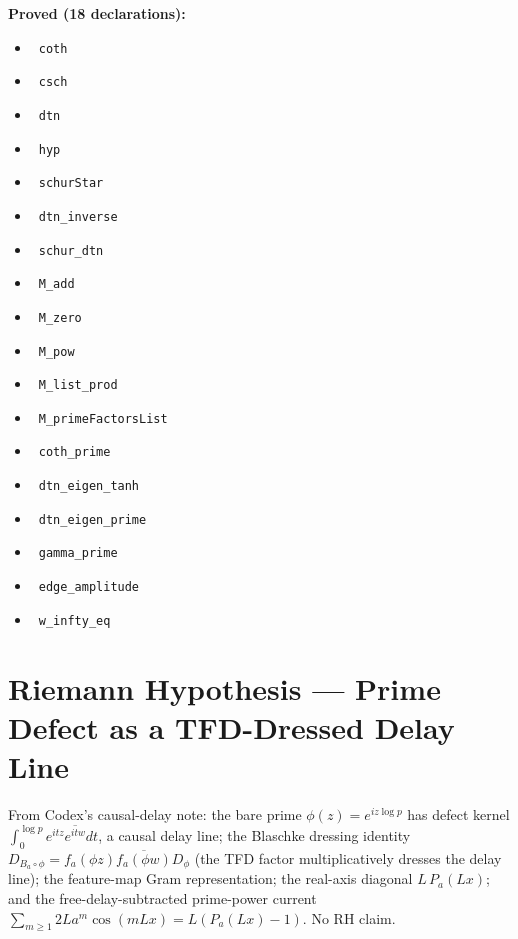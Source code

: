 \documentclass{report}
\theoremstyle{definition}
\begin{document}
\noindent\textbf{Proved (18 declarations):}
\begin{itemize}
  \item {}\leanok\ \texttt{coth}
  \item {}\leanok\ \texttt{csch}
  \item {}\leanok\ \texttt{dtn}
  \item {}\leanok\ \texttt{hyp}
  \item {}\leanok\ \texttt{schurStar}
  \item {}\leanok\ \texttt{dtn\_inverse}
  \item {}\leanok\ \texttt{schur\_dtn}
  \item {}\leanok\ \texttt{M\_add}
  \item {}\leanok\ \texttt{M\_zero}
  \item {}\leanok\ \texttt{M\_pow}
  \item {}\leanok\ \texttt{M\_list\_prod}
  \item {}\leanok\ \texttt{M\_primeFactorsList}
  \item {}\leanok\ \texttt{coth\_prime}
  \item {}\leanok\ \texttt{dtn\_eigen\_tanh}
  \item {}\leanok\ \texttt{dtn\_eigen\_prime}
  \item {}\leanok\ \texttt{gamma\_prime}
  \item {}\leanok\ \texttt{edge\_amplitude}
  \item {}\leanok\ \texttt{w\_infty\_eq}
\end{itemize}

\section{Riemann Hypothesis --- Prime Defect as a TFD-Dressed Delay Line}
From Codex's causal-delay note: the bare prime $\phi(z)=e^{iz\log p}$ has defect kernel $\int_0^{\log p}e^{itz}\overline{e^{itw}}dt$, a causal delay line; the Blaschke dressing identity $D_{B_a\circ\phi}=f_a(\phi z)\overline{f_a(\phi w)}D_\phi$ (the TFD factor multiplicatively dresses the delay line); the feature-map Gram representation; the real-axis diagonal $L\,P_a(Lx)$; and the free-delay-subtracted prime-power current $\sum_{m\ge1}2La^m\cos(mLx)=L(P_a(Lx)-1)$. No RH claim.
\end{document}
